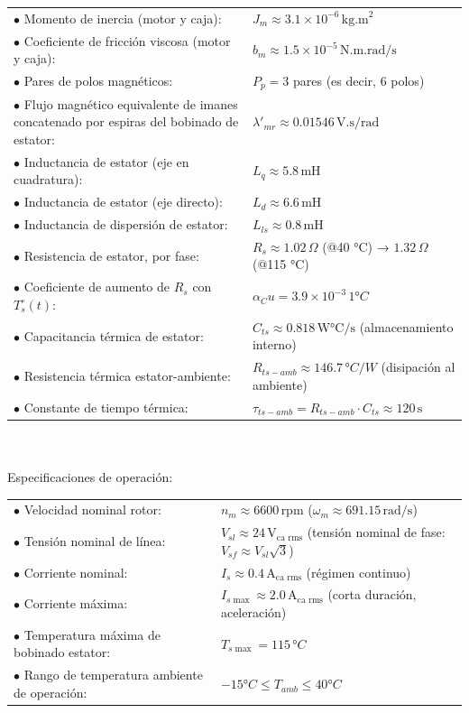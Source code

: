 \documentclass{article}
\begin{document}
    \begin{tabular}{@{} p{} p{} @{}}
        \(\bullet\) Momento de inercia (motor y caja): & \(J_m \approx 3.1 \times 10^{-6} \, \text{kg.m}^2\) \\
        \(\bullet\) Coeficiente de fricción viscosa (motor y caja): & \(b_m \approx 1.5 \times 10^{-5} \, \text{N.m.rad/s}\) \\
        \(\bullet\) Pares de polos magnéticos: & \(P_p = 3\) pares (es decir, 6 polos) \\
        \(\bullet\) Flujo magnético equivalente de imanes concatenado por espiras del bobinado de estator: & \(\lambda'_{mr} \approx 0.01546 \, \text{V.s/rad}\)\\
        \(\bullet\) Inductancia de estator (eje en cuadratura): & \(L_q \approx 5.8 \, \text{mH}\) \\
        \(\bullet\) Inductancia de estator (eje directo): & \(L_d \approx 6.6 \, \text{mH}\) \\
        \(\bullet\) Inductancia de dispersión de estator: & \(L_{ls} \approx 0.8 \, \text{mH}\) \\
        \(\bullet\) Resistencia de estator, por fase: & \(R_s \approx 1.02 \, \Omega\) (@40 °C) → \(1.32 \, \Omega\) (@115 °C) \\
        \(\bullet\) Coeficiente de aumento de \(R_s\) con \(T_s^\circ(t)\): & \(\alpha_Cu = 3.9 \times 10^{-3} \, 1°C\) \\
        \(\bullet\) Capacitancia térmica de estator: & \(C_{ts} \approx 0.818 \, \text{W°C/s}\) (almacenamiento interno) \\
        \(\bullet\) Resistencia térmica estator-ambiente: & \(R_{ts-amb} \approx 146.7 \, °C/W\) (disipación al ambiente) \\
        \(\bullet\) Constante de tiempo térmica: & \(\tau_{ts-amb} = R_{ts-amb} \cdot C_{ts} \approx 120 \, \text{s}\)
    \end{tabular}    
    \\\\
    Especificaciones de operación:\\

    \begin{tabular}{@{} p{} p{} @{}}
        \(\bullet\) Velocidad nominal rotor: & \(n_m \approx 6600 \, \text{rpm}\) (\(\omega_m \approx 691.15 \, \text{rad/s}\)) \\
        \(\bullet\) Tensión nominal de línea: & \(V_{sl} \approx 24 \, \text{V}_{\text{ca rms}}\) (tensión nominal de fase: \(V_{sf} \approx V_{sl} \sqrt{3}\)) \\
        \(\bullet\) Corriente nominal: & \(I_s \approx 0.4 \, \text{A}_{\text{ca rms}}\) (régimen continuo) \\
        \(\bullet\) Corriente máxima: & \(I_{s \max} \approx 2.0 \, \text{A}_{\text{ca rms}}\) (corta duración, aceleración) \\
        \(\bullet\) Temperatura máxima de bobinado estator: & \(T_{s \max} = 115 \, °C\) \\
        \(\bullet\) Rango de temperatura ambiente de operación: & \(-15 °C \leq T_{amb} \leq 40 °C\)
    \end{tabular}
\end{document}
